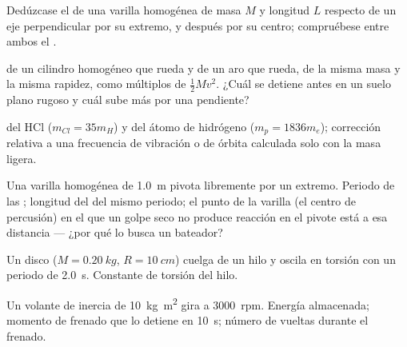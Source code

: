 \begin{exercise}[$\star$]\label{exo:b1:systems-of-points:4}
Dedúzcase el  de una varilla homogénea de masa $M$ y
longitud $L$ respecto de un eje perpendicular por su extremo, y después
por su centro; compruébese entre ambos el .
\end{exercise}

\begin{exercise}[$\star\star$]\label{exo:b1:systems-of-points:5}
 de un cilindro homogéneo que rueda y de un aro que rueda,
de la misma masa y la misma rapidez, como múltiplos de $\tfrac12 Mv^2$.
¿Cuál se detiene antes en un suelo plano rugoso y cuál sube más por una pendiente?
\end{exercise}

\begin{exercise}[$\star\star$]\label{exo:b1:systems-of-points:6}
 del HCl ($m_{Cl} = 35m_H$) y del átomo de hidrógeno
($m_p = 1836m_e$); corrección relativa a una frecuencia de vibración o
de órbita calculada solo con la masa ligera.
\end{exercise}

\begin{exercise}[$\star\star$]\label{exo:b1:systems-of-points:7}
Una varilla homogénea de \qty{1.0}{m} pivota libremente por un extremo.
Periodo de las ; longitud del  del
mismo periodo; el punto de la varilla (el centro de percusión) en el que
un golpe seco no produce reacción en el pivote está a esa distancia ---
¿por qué lo busca un bateador?
\end{exercise}

\begin{exercise}[$\star\star$]\label{exo:b1:systems-of-points:8}
Un disco ($M = \qty{0.20}{kg}$, $R = \qty{10}{cm}$) cuelga de un hilo y
oscila en torsión con un periodo de \qty{2.0}{s}. Constante de torsión del
hilo.
\end{exercise}

\begin{exercise}[$\star\star$]\label{exo:b1:systems-of-points:9}
Un volante de inercia de \qty{10}{kg.m^2} gira a \qty{3000}{rpm}. Energía
almacenada; momento de frenado que lo detiene en \qty{10}{s}; número de
vueltas durante el frenado.
\end{exercise}

